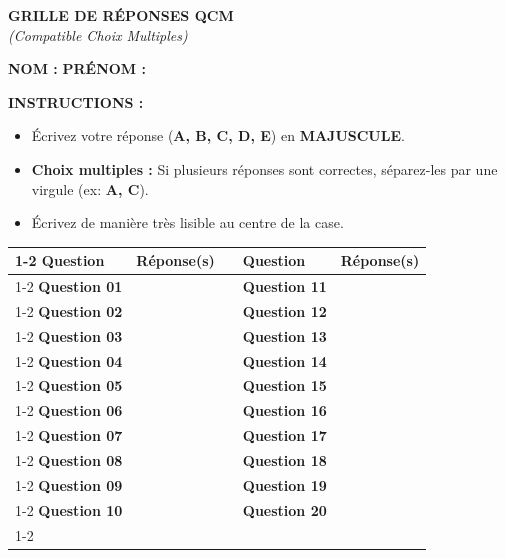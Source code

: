\documentclass[12pt,a4paper]{article}
\begin{document}
\begin{center}
    {\Huge \textbf{GRILLE DE RÉPONSES QCM}} \\
    \textit{\large (Compatible Choix Multiples)}
\end{center}

\vspace{0.8cm}

\textbf{NOM :} \underline{\hspace{6cm}} \hfill \textbf{PRÉNOM :} \underline{\hspace{6cm}}

\vspace{1cm}

\textbf{INSTRUCTIONS :} 
\begin{itemize}
    \item Écrivez votre réponse (\textbf{A, B, C, D, E}) en \textbf{MAJUSCULE}.
    \item \textbf{Choix multiples :} Si plusieurs réponses sont correctes, séparez-les par une virgule (ex: \textbf{A, C}).
    \item Écrivez de manière très lisible au centre de la case.
\end{itemize}

\vspace{1cm}

\begin{center}
\renewcommand{\arraystretch}{2.2}
\begin{tabular}{|m{3.5cm}|m{3cm}|m{0.5cm}|m{3.5cm}|m{3cm}|}
\cline{1-2} \cline{4-5}
\rowcolor{gray!20} \textbf{Question} & \textbf{Réponse(s)} & & \textbf{Question} & \textbf{Réponse(s)} \\ \cline{1-2} \cline{4-5}
\textbf{Question 01} & & & \textbf{Question 11} & \\ \cline{1-2} \cline{4-5}
\textbf{Question 02} & & & \textbf{Question 12} & \\ \cline{1-2} \cline{4-5}
\textbf{Question 03} & & & \textbf{Question 13} & \\ \cline{1-2} \cline{4-5}
\textbf{Question 04} & & & \textbf{Question 14} & \\ \cline{1-2} \cline{4-5}
\textbf{Question 05} & & & \textbf{Question 15} & \\ \cline{1-2} \cline{4-5}
\textbf{Question 06} & & & \textbf{Question 16} & \\ \cline{1-2} \cline{4-5}
\textbf{Question 07} & & & \textbf{Question 17} & \\ \cline{1-2} \cline{4-5}
\textbf{Question 08} & & & \textbf{Question 18} & \\ \cline{1-2} \cline{4-5}
\textbf{Question 09} & & & \textbf{Question 19} & \\ \cline{1-2} \cline{4-5}
\textbf{Question 10} & & & \textbf{Question 20} & \\ \cline{1-2} \cline{4-5}
\end{tabular}
\end{center}
\end{document}
